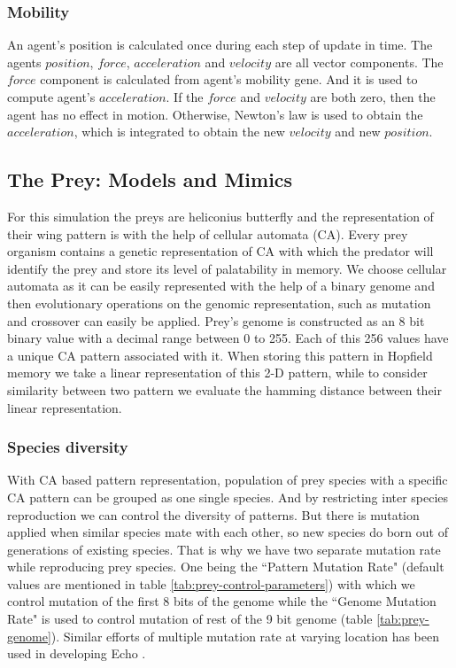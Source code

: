 \documentclass[letterpaper]{article}
\numberwithin{equation}{section}
\begin{document}
\subsubsection{Mobility}
An agent's position is calculated once during each step of update in time. The agents \(position\), \(force\), \(acceleration\) and \(velocity\) are all vector components. The \(force\) component is calculated from agent's mobility gene. And it is used to compute agent's \(acceleration\). If the \(force\) and \(velocity\) are both zero, then the agent has no effect in motion. Otherwise, Newton's law is used to obtain the \(acceleration\), which is integrated to obtain the new \(velocity\) and new \(position\).

\subsection{The Prey: Models and Mimics}

For this simulation the preys are heliconius butterfly and the representation of their wing pattern is with the help of cellular automata (CA). Every prey organism contains a genetic representation of CA with which the predator will identify the prey and store its level of palatability in memory. We choose cellular automata as it can be easily represented with the help of a binary genome and then evolutionary operations on the genomic representation, such as mutation and crossover can easily be applied. Prey's genome is constructed as an 8 bit binary value with a decimal range between 0 to 255. Each of this 256 values have a unique CA pattern associated with it. When storing this pattern in Hopfield memory we take a linear representation of this 2-D pattern, while to consider similarity between two pattern we evaluate the hamming distance between their linear representation. 

\subsubsection{Species diversity}
\label{subsubsec:species-diversity}
With CA based pattern representation, population of prey species with a specific CA pattern can be grouped as one single species. And by restricting inter species reproduction we can control the diversity of patterns. But there is mutation applied when similar species mate with each other, so new species do born out of generations of existing species. That is why we have two separate mutation rate while reproducing prey species. One being the ``Pattern Mutation Rate" (default values are mentioned in table \ref{tab:prey-control-parameters}) with which we control mutation of the first 8 bits of the genome while the ``Genome Mutation Rate" is used to control mutation of rest of the 9 bit genome (table \ref{tab:prey-genome}). Similar efforts of multiple mutation rate at varying location has been used in developing Echo \citep{hraber1997}.
\end{document}
